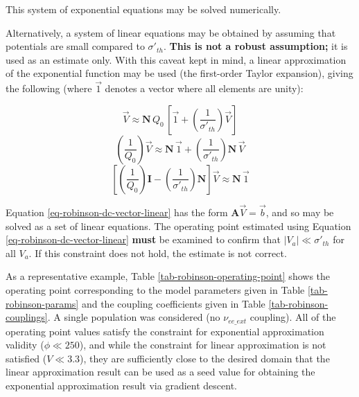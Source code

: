 This system of exponential equations may be solved numerically.

Alternatively, a system of linear equations may be obtained by assuming
that potentials are small compared to $\sigma'_{th}$.
\textbf{This is not a robust assumption;} it is used as an estimate only.
With this caveat kept in mind, a linear approximation of the exponential
function may be used (the first-order Taylor expansion), giving the following
(where $\vec{1}$ denotes a vector where all elements are unity):

\begin{equation}
\vec{V} \approx \mathbf{N} \, Q_0 \,
\left [ \vec{1} + \left ( \frac{1}{\sigma'_{th}} \right ) \vec{V} \right ]
\end{equation}
%
\begin{equation}
\left ( \frac{1}{Q_0} \right ) \vec{V} \approx \mathbf{N} \, \vec{1}
+ \left ( \frac{1}{\sigma'_{th}} \right ) \mathbf{N} \, \vec{V}
\end{equation}
%
\begin{equation}
\left [ \left ( \frac{1}{Q_0} \right ) \mathbf{I}
- \left ( \frac{1}{\sigma'_{th}} \right ) \mathbf{N}
\right ] \vec{V} \approx \mathbf{N} \, \vec{1}
\label{eq-robinson-dc-vector-linear}
\end{equation}

Equation \ref{eq-robinson-dc-vector-linear} has the form
$\mathbf{A} \vec{V} = \vec{b}$, and so may be solved as a set of linear
equations. The operating point estimated using Equation
\ref{eq-robinson-dc-vector-linear} \textbf{must} be examined to confirm
that $|V_a| \ll \sigma'_{th}$ for all $V_a$. If this constraint does not
hold, the estimate is not correct.

As a representative example, Table \ref{tab-robinson-operating-point} shows
the operating point corresponding to the model parameters given in Table
\ref{tab-robinson-params} and the coupling coefficients given in Table
\ref{tab-robinson-couplings}. A single population was considered (no
$\nu_{ee\_ext}$ coupling). All of the operating point values satisfy the
constraint for exponential approximation validity ($\phi \ll 250$), and
while the constraint for linear approximation is not satisfied
($V \ll 3.3$), they are sufficiently close to the desired domain that the
linear approximation result can be used as a seed value for obtaining the
exponential approximation result via gradient descent.

